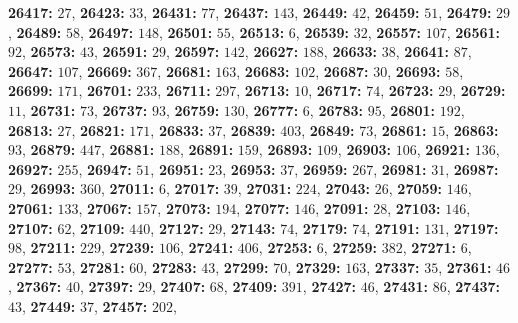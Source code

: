 \textsf{\bfseries 26417:} $27$, \textsf{\bfseries 26423:} $33$, \textsf{\bfseries 26431:} $77$, \textsf{\bfseries 26437:} $143$, \textsf{\bfseries 26449:} $42$, \textsf{\bfseries 26459:} $51$, \textsf{\bfseries 26479:} $29$, \textsf{\bfseries 26489:} $58$, \textsf{\bfseries 26497:} $148$, \textsf{\bfseries 26501:} $55$, \textsf{\bfseries 26513:} $6$, \textsf{\bfseries 26539:} $32$, \textsf{\bfseries 26557:} $107$, \textsf{\bfseries 26561:} $92$, \textsf{\bfseries 26573:} $43$, \textsf{\bfseries 26591:} $29$, \textsf{\bfseries 26597:} $142$, \textsf{\bfseries 26627:} $188$, \textsf{\bfseries 26633:} $38$, \textsf{\bfseries 26641:} $87$, \textsf{\bfseries 26647:} $107$, \textsf{\bfseries 26669:} $367$, \textsf{\bfseries 26681:} $163$, \textsf{\bfseries 26683:} $102$, \textsf{\bfseries 26687:} $30$, \textsf{\bfseries 26693:} $58$, \textsf{\bfseries 26699:} $171$, \textsf{\bfseries 26701:} $233$, \textsf{\bfseries 26711:} $297$, \textsf{\bfseries 26713:} $10$, \textsf{\bfseries 26717:} $74$, \textsf{\bfseries 26723:} $29$, \textsf{\bfseries 26729:} $11$, \textsf{\bfseries 26731:} $73$, \textsf{\bfseries 26737:} $93$, \textsf{\bfseries 26759:} $130$, \textsf{\bfseries 26777:} $6$, \textsf{\bfseries 26783:} $95$, \textsf{\bfseries 26801:} $192$, \textsf{\bfseries 26813:} $27$, \textsf{\bfseries 26821:} $171$, \textsf{\bfseries 26833:} $37$, \textsf{\bfseries 26839:} $403$, \textsf{\bfseries 26849:} $73$, \textsf{\bfseries 26861:} $15$, \textsf{\bfseries 26863:} $93$, \textsf{\bfseries 26879:} $447$, \textsf{\bfseries 26881:} $188$, \textsf{\bfseries 26891:} $159$, \textsf{\bfseries 26893:} $109$, \textsf{\bfseries 26903:} $106$, \textsf{\bfseries 26921:} $136$, \textsf{\bfseries 26927:} $255$, \textsf{\bfseries 26947:} $51$, \textsf{\bfseries 26951:} $23$, \textsf{\bfseries 26953:} $37$, \textsf{\bfseries 26959:} $267$, \textsf{\bfseries 26981:} $31$, \textsf{\bfseries 26987:} $29$, \textsf{\bfseries 26993:} $360$, \textsf{\bfseries 27011:} $6$, \textsf{\bfseries 27017:} $39$, \textsf{\bfseries 27031:} $224$, \textsf{\bfseries 27043:} $26$, \textsf{\bfseries 27059:} $146$, \textsf{\bfseries 27061:} $133$, \textsf{\bfseries 27067:} $157$, \textsf{\bfseries 27073:} $194$, \textsf{\bfseries 27077:} $146$, \textsf{\bfseries 27091:} $28$, \textsf{\bfseries 27103:} $146$, \textsf{\bfseries 27107:} $62$, \textsf{\bfseries 27109:} $440$, \textsf{\bfseries 27127:} $29$, \textsf{\bfseries 27143:} $74$, \textsf{\bfseries 27179:} $74$, \textsf{\bfseries 27191:} $131$, \textsf{\bfseries 27197:} $98$, \textsf{\bfseries 27211:} $229$, \textsf{\bfseries 27239:} $106$, \textsf{\bfseries 27241:} $406$, \textsf{\bfseries 27253:} $6$, \textsf{\bfseries 27259:} $382$, \textsf{\bfseries 27271:} $6$, \textsf{\bfseries 27277:} $53$, \textsf{\bfseries 27281:} $60$, \textsf{\bfseries 27283:} $43$, \textsf{\bfseries 27299:} $70$, \textsf{\bfseries 27329:} $163$, \textsf{\bfseries 27337:} $35$, \textsf{\bfseries 27361:} $46$, \textsf{\bfseries 27367:} $40$, \textsf{\bfseries 27397:} $29$, \textsf{\bfseries 27407:} $68$, \textsf{\bfseries 27409:} $391$, \textsf{\bfseries 27427:} $46$, \textsf{\bfseries 27431:} $86$, \textsf{\bfseries 27437:} $43$, \textsf{\bfseries 27449:} $37$, \textsf{\bfseries 27457:} $202$, 
